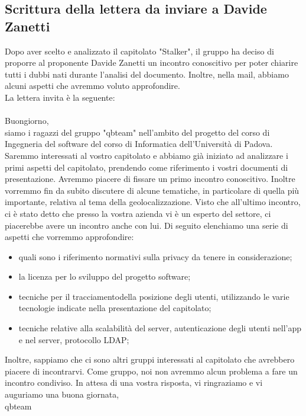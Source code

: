 \subsection{Scrittura della lettera da inviare a Davide Zanetti}
Dopo aver scelto e analizzato il capitolato "Stalker", il gruppo ha deciso di proporre al proponente Davide Zanetti un incontro conoscitivo per poter chiarire tutti i dubbi nati durante l'analisi del documento. Inoltre, nella mail, abbiamo alcuni aspetti che avremmo voluto approfondire.
\\La lettera invita è la seguente:
\\\\Buongiorno,
\\siamo i ragazzi del gruppo "qbteam" nell'ambito del progetto del corso di Ingegneria del software del corso di Informatica dell'Università di Padova. Saremmo interessati al vostro capitolato e abbiamo già iniziato ad analizzare i primi aspetti del capitolato, prendendo come riferimento i vostri documenti di presentazione. Avremmo piacere di fissare un primo incontro conoscitivo. Inoltre vorremmo fin da subito discutere di alcune tematiche, in particolare di quella più importante, relativa al tema della geolocalizzazione. Visto che all'ultimo incontro, ci è stato detto che presso la vostra azienda vi è un esperto del settore, ci piacerebbe avere un incontro anche con lui. Di seguito elenchiamo una serie di aspetti che vorremmo approfondire:
\begin{itemize}
	\item quali sono i riferimento normativi sulla privacy da tenere in considerazione;
	\item  la licenza per lo sviluppo del progetto software;
	\item tecniche per il tracciamentodella posizione degli utenti, utilizzando le varie tecnologie indicate nella presentazione del capitolato;
	\item tecniche relative alla scalabilità del server, autenticazione degli utenti nell'app e nel server, protocollo LDAP;
\end{itemize}
Inoltre, sappiamo che ci sono altri gruppi interessati al capitolato che avrebbero piacere di incontrarvi. Come gruppo, noi non avremmo alcun problema a fare un incontro condiviso.
In attesa di una vostra risposta, vi ringraziamo e vi auguriamo una buona giornata,
\\qbteam

